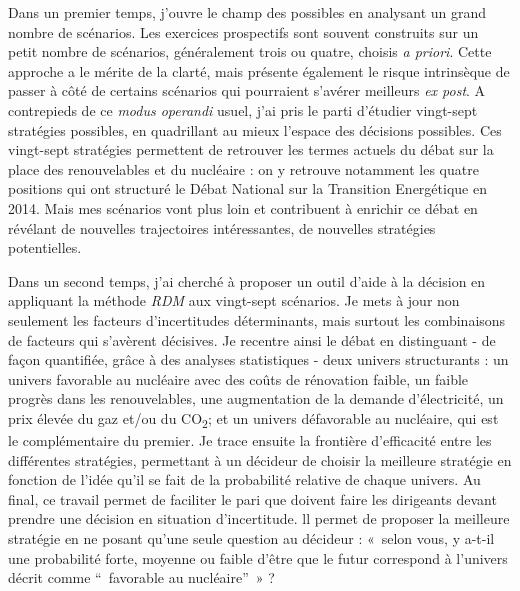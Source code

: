 Dans un premier temps, j'ouvre le champ des possibles en analysant un grand nombre de scénarios. Les exercices prospectifs sont souvent construits sur un petit nombre de scénarios, généralement trois ou quatre, choisis \textit{a priori}. Cette approche a le mérite de la clarté, mais présente également le risque intrinsèque de passer à côté de certains scénarios qui pourraient s'avérer meilleurs \textit{ex post}.
A contrepieds de ce \textit{modus operandi} usuel, j'ai pris le parti d'étudier vingt-sept stratégies possibles, en quadrillant au mieux l'espace des décisions possibles. Ces vingt-sept stratégies permettent de retrouver les termes actuels du débat sur la place des renouvelables et du nucléaire : on y retrouve notamment les quatre positions qui ont structuré le Débat National sur la Transition Energétique en 2014. Mais mes scénarios vont plus loin et contribuent à enrichir ce débat en révélant de nouvelles trajectoires intéressantes, de nouvelles stratégies potentielles. 

Dans un second temps, j'ai cherché à proposer un outil d'aide à la décision en appliquant la méthode \textit{RDM} aux vingt-sept scénarios. Je mets à jour non seulement les facteurs d'incertitudes déterminants, mais surtout les combinaisons de facteurs qui s'avèrent décisives.
Je recentre ainsi le débat en distinguant - de façon quantifiée, grâce à des analyses statistiques - deux univers structurants : un univers favorable au nucléaire avec des coûts de rénovation faible, un faible progrès dans les renouvelables, une augmentation de la demande d'électricité, un prix élevée du gaz et/ou du CO\textsubscript{2}; et un univers défavorable au nucléaire, qui est le complémentaire du premier.
Je trace ensuite la frontière d'efficacité entre les différentes stratégies, permettant à un décideur de choisir la meilleure stratégie en fonction de l'idée qu'il se fait de la probabilité relative de chaque univers. 
Au final, ce travail permet de faciliter le pari que doivent faire les dirigeants devant prendre une décision en situation d’incertitude. ll permet de proposer la meilleure stratégie en ne posant qu'une seule question au décideur : «~selon vous, y a-t-il une probabilité forte, moyenne ou faible d'être que le futur correspond à l'univers décrit comme “~favorable au nucléaire”~» ?
 
